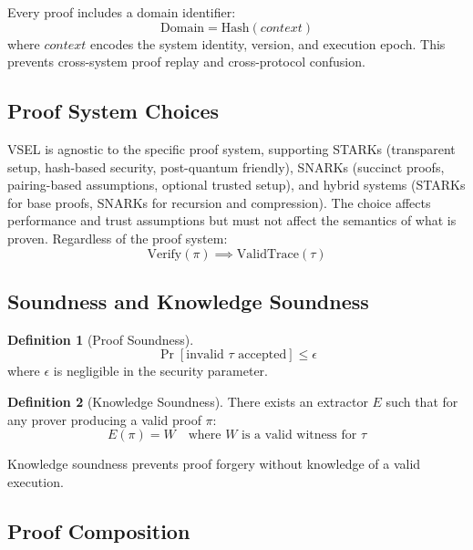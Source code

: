 \documentclass[11pt,a4paper]{article}
\theoremstyle{definition}
\newtheorem{definition}{Definition}[section]
\newcommand{\Verify}{\mathrm{Verify}}
\newcommand{\Hash}{\mathrm{Hash}}
\newcommand{\ValidTrace}{\mathrm{ValidTrace}}
\newcommand{\Domain}{\mathrm{Domain}}
\begin{document}
Every proof includes a domain identifier:
\begin{equation}
\Domain = \Hash(\mathit{context})
\end{equation}
where $\mathit{context}$ encodes the system identity, version, and execution epoch. This prevents cross-system proof replay and cross-protocol confusion.

\subsection{Proof System Choices}
\label{subsec:proof-choices}

VSEL is agnostic to the specific proof system, supporting STARKs (transparent setup, hash-based security, post-quantum friendly), SNARKs (succinct proofs, pairing-based assumptions, optional trusted setup), and hybrid systems (STARKs for base proofs, SNARKs for recursion and compression). The choice affects performance and trust assumptions but must not affect the semantics of what is proven. Regardless of the proof system:
\begin{equation}
\Verify(\pi) \implies \ValidTrace(\tau)
\end{equation}

\subsection{Soundness and Knowledge Soundness}
\label{subsec:proof-soundness}

\begin{definition}[Proof Soundness]
\label{def:proof-soundness}
\begin{equation}
\Pr[\text{invalid } \tau \text{ accepted}] \leq \epsilon
\end{equation}
where $\epsilon$ is negligible in the security parameter.
\end{definition}

\begin{definition}[Knowledge Soundness]
\label{def:knowledge-soundness}
There exists an extractor $E$ such that for any prover producing a valid proof $\pi$:
\begin{equation}
E(\pi) = W \quad \text{where } W \text{ is a valid witness for } \tau
\end{equation}
\end{definition}

Knowledge soundness prevents proof forgery without knowledge of a valid execution.

\subsection{Proof Composition}
\label{subsec:proof-composition}
\end{document}
